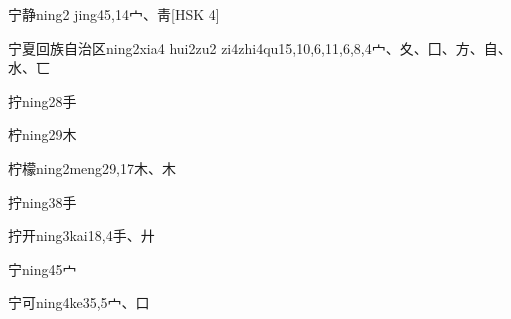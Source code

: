 \begin{EntryWithPhonetic}{宁静}{ning2 jing4}{5,14}{⼧、⾭}[HSK 4]
\end{EntryWithPhonetic}

\begin{EntryWithPhonetic}{宁夏回族自治区}{ning2xia4 hui2zu2 zi4zhi4qu1}{5,10,6,11,6,8,4}{⼧、⼢、⼞、⽅、⾃、⽔、⼖}
\end{EntryWithPhonetic}

\begin{EntryWithPhonetic}{拧}{ning2}{8}{⼿}
\end{EntryWithPhonetic}

\begin{EntryWithPhonetic}{柠}{ning2}{9}{⽊}
\end{EntryWithPhonetic}

\begin{EntryWithPhonetic}{柠檬}{ning2meng2}{9,17}{⽊、⽊}
\end{EntryWithPhonetic}

\begin{EntryWithPhonetic}{拧}{ning3}{8}{⼿}
\end{EntryWithPhonetic}

\begin{EntryWithPhonetic}{拧开}{ning3kai1}{8,4}{⼿、⼶}
\end{EntryWithPhonetic}

\begin{EntryWithPhonetic}{宁}{ning4}{5}{⼧}
\end{EntryWithPhonetic}

\begin{EntryWithPhonetic}{宁可}{ning4ke3}{5,5}{⼧、⼝}
\end{EntryWithPhonetic}

